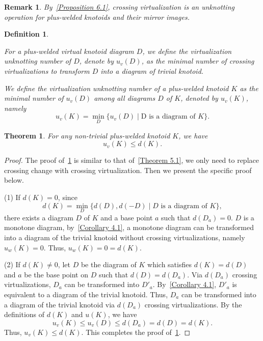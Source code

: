 \documentclass[11pt]{amsart}
\theoremstyle{noparens}
\newtheorem{theorem}{Theorem}[section]
\newtheorem{remark}{Remark}[section]
\newtheorem{definition}{Definition}[section]
\numberwithin{equation}{section}
\numberwithin{equation}{section}
\begin{document}
\begin{remark}
By~\cref{Proposition 6.1}, crossing virtualization is an unknotting operation for plus-welded knotoids and their mirror images. 
\end{remark}


\begin{definition} \label{Definition 6.1}
\rm{
For a plus-welded virtual knotoid diagram $D$, we define the \textit{virtualization unknotting number} of $D$, denote by $u_v(D)$, as the minimal number of crossing virtualizations to transform $D$ into a diagram of trivial knotoid. 
	
We define the \textit{virtualization unknotting number} of a plus-welded knotoid $K$ as the minimal number of $u_v(D)$ among all diagrams $D$ of $K$, denoted by $u_v(K)$, namely 
$$
u_v(K) = \min_{D} \{ u_v(D) \mid \text{D is a diagram} \text{ of } K\}.
$$
} 
\end{definition}


\begin{theorem} \label{Theorem 6.1}
For any non-trivial plus-welded knotoid $K$, we have
$$
u_v(K) \leq d(K).
$$
\end{theorem}

\begin{proof}
The proof of~\cref{Theorem 6.1} is similar to that of~\cref{Theorem 5.1}, we only need to replace crossing change with crossing virtualization. Then we present the specific proof below. 

(1) If $d(K) = 0$, since 
$$
d(K) = \min_{D} \{ d(D), d(-D) \mid \text{$D$ is a diagram} \text{ of $K$}\},
$$
there exists a diagram $D$ of $K$ and a base point $a$ such that $d(D_a) = 0$. $D$ is a monotone diagram, by~\cref{Corollary 4.1}, a monotone diagram can be transformed into a diagram of the trivial knotoid without crossing virtualizations, namely $u_w(K) = 0$.  Thus, $u_w(K) = 0 = d(K)$. 

(2) If $d(K) \neq 0$, let $D$ be the diagram of $K$ which satisfies $d(K) = d(D)$ and $a$ be the base point on $D$ such that $d(D) = d(D_a)$. Via $d(D_a)$ crossing virtualizations, $D_a$ can be transformed into $D'_a$. By~\cref{Corollary 4.1}, $D'_a$ is equivalent to a diagram of the trivial knotoid. Thus, $D_a$ can be transformed into a diagram of the trivial knotoid via $d( D_a)$ crossing virtualizations. By the definitions of $d(K)$ and $u(K)$, we have 
	$$
    u_v(K) \leq u_v(D) \leq d( D_a)=  d(D)=d(K).
	$$
Thus, $u_v(K) \leq d(K)$. This completes the proof of~\cref{Theorem 6.1}.
\end{proof} 
\end{document}

